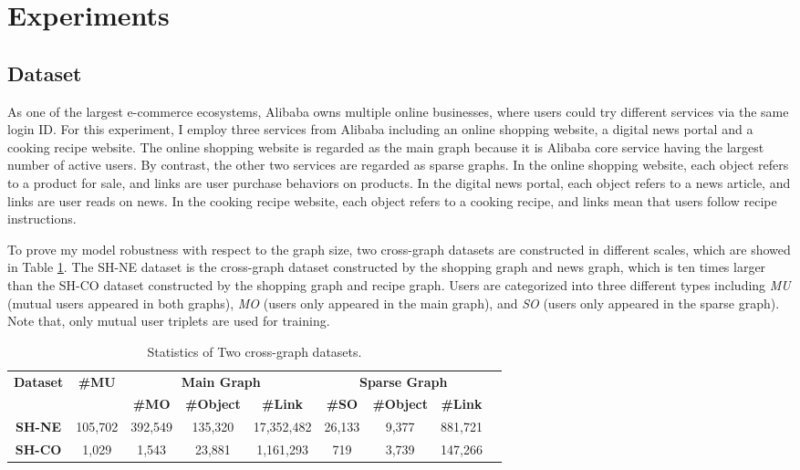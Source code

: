 \section{Experiments}  \label{sc:exp}
\subsection{Dataset}  \label{sc:dataset}
As one of the largest e-commerce ecosystems, Alibaba owns multiple online businesses, where users could try different services via the same login ID. For this experiment, I employ three services from Alibaba including an online shopping website, a digital news portal and a cooking recipe website. The online shopping website is regarded as the main graph because it is Alibaba core service having the largest number of active users. By contrast, the other two services are regarded as sparse graphs. In the online shopping website, each object refers to a product for sale, and links are user purchase behaviors on products. In the digital news portal, each object refers to a news article, and links are user reads on news. In the cooking recipe website, each object refers to a cooking recipe, and links mean that users follow recipe instructions. 

To prove my model robustness with respect to the graph size, two cross-graph datasets are constructed in different scales, which are showed in Table \ref{tab:dataset}. The SH-NE dataset is the cross-graph dataset constructed by the shopping graph and news graph, which is ten times larger than the SH-CO dataset constructed by the shopping graph and recipe graph. Users are categorized into three different types including \textit{MU} (mutual users appeared in both graphs),  \textit{MO} (users only appeared in the main graph), and  \textit{SO} (users only appeared in the sparse graph). Note that, only mutual user triplets are used for training.

\begin{table}[h]
	
	\centering
	\begin{tabular}{ccccccccc} 
		\toprule
		\multirow{2}{*}{\textbf{Dataset}}& \multirow{2}{*}{\textbf{\#MU}}&\multicolumn{3}{c}{\textbf{Main Graph}}& \multicolumn{3}{c}{\textbf{Sparse Graph}}\\ \cmidrule(lr){3-8}
		&  &\textbf{\#MO}&\textbf{\#Object}& \textbf{\#Link}&\textbf{\#SO}&\textbf{\#Object}& \textbf{\#Link}\\ \midrule
		\textbf{SH-NE}& 105,702 & 392,549 & 135,320 & 17,352,482  & 26,133 & 9,377 & 881,721\\ 
		\textbf{SH-CO}& 1,029  & 1,543  &23,881 & 1,161,293& 719  & 3,739 &147,266\\\bottomrule
	\end{tabular}
	\caption{Statistics of Two cross-graph datasets.}
	\label{tab:dataset}
\end{table}  

